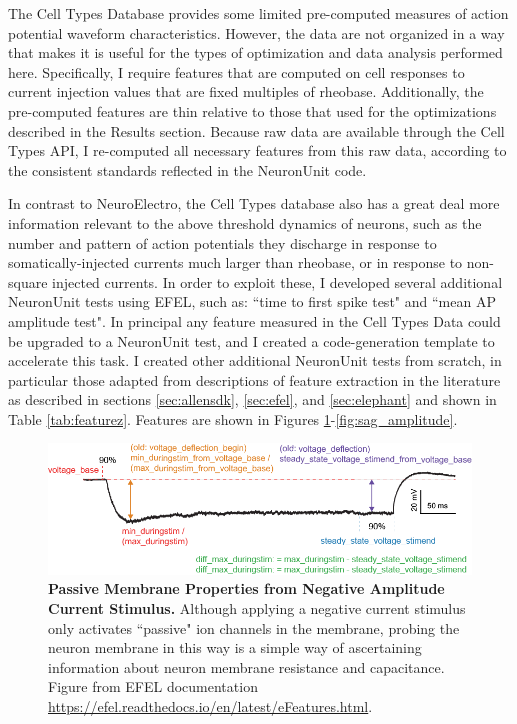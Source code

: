 The Cell Types Database provides some limited pre-computed measures of action potential waveform characteristics. 
However, the data are not organized in a way that makes it is useful for the types of optimization and data analysis performed here.
Specifically, I require features that are computed on cell responses to current injection values that are fixed multiples of rheobase.
Additionally, the pre-computed features are thin relative to those that used for the optimizations described in the Results section.
Because raw data are available through the Cell Types API, I re-computed all necessary features from this raw data, according to the consistent standards reflected in the NeuronUnit code.

In contrast to NeuroElectro, the Cell Types database also has a great deal more information relevant to the above threshold dynamics of neurons, such as the number and pattern of action potentials they discharge in response to somatically-injected currents much larger than rheobase, or in response to non-square injected currents.
In order to exploit these, I developed several additional NeuronUnit tests using EFEL, such as: ``time to first spike test" and ``mean AP amplitude test". In principal any feature measured in the Cell Types Data could be upgraded to a NeuronUnit test, and I created a code-generation template to accelerate this task.
I created other additional NeuronUnit tests from scratch, in particular those adapted from descriptions of feature extraction in the literature as described in sections \ref{sec:allensdk}, \ref{sec:efel}, and \ref{sec:elephant} and shown in Table \ref{tab:featurez}. Features are shown in Figures \ref{fig:voltage_figures}-\ref{fig:sag_amplitude}.

\begin{figure}
\centering
\includegraphics{figures/voltage_features.png}
\caption[Passive Membrane Properties from Negative Amplitude Current Stimulus]{\textbf{Passive Membrane Properties from Negative Amplitude Current Stimulus.} Although applying a negative current stimulus only activates ``passive" ion channels in the membrane, probing the neuron membrane in this way is a simple way of ascertaining information about neuron membrane resistance and capacitance. Figure from EFEL documentation \url{https://efel.readthedocs.io/en/latest/eFeatures.html}.}
\label{fig:voltage_figures}
\end{figure}

